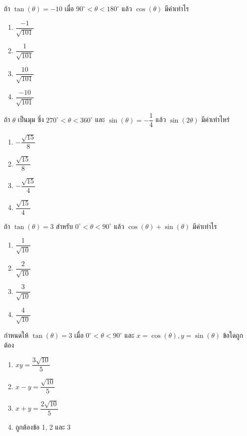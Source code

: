 \begin{examplebox}
ถ้า $\tan(\theta)=-10$ เมื่อ $90^{\circ}<\theta<180^{\circ}$ แล้ว $\cos(\theta)$ มีค่าเท่าไร
\begin{enumerate}
\item $\dfrac{-1}{\sqrt{101}}$
\item $\dfrac{1}{\sqrt{101}}$
\item $\dfrac{10}{\sqrt{101}}$
\item $\dfrac{-10}{\sqrt{101}}$
\end{enumerate}
\end{examplebox}

\begin{examplebox}
ถ้า $\theta$ เป็นมุม ซึ่ง $270^{\circ}<\theta<360^{\circ}$ และ $\sin(\theta)=-\dfrac{1}{4}$ แล้ว $\sin(2\theta)$ มีค่าเท่าไหร่
\begin{enumerate}
\item $-\dfrac{\sqrt{15}}{8}$
\item $\dfrac{\sqrt{15}}{8}$
\item $-\dfrac{\sqrt{15}}{4}$
\item $\dfrac{\sqrt{15}}{4}$
\end{enumerate}
\end{examplebox}

\begin{examplebox}
ถ้า $\tan(\theta)=3$ สำหรับ $0^{\circ}<\theta<90^{\circ}$ แล้ว $\cos(\theta)+\sin( \theta)$ มีค่าเท่าไร
\begin{enumerate}
\item $\dfrac{1}{\sqrt{10}}$
\item $\dfrac{2}{\sqrt{10}}$
\item $\dfrac{3}{\sqrt{10}}$
\item $\dfrac{4}{\sqrt{10}}$
\end{enumerate}
\end{examplebox}

\begin{examplebox}
กำหนดให้ $\tan(\theta)=3$ เมื่อ $0^{\circ}<\theta<90^{\circ}$ และ $x=\cos(\theta), y=\sin(\theta)$ ข้อใดถูกต้อง
\begin{enumerate}
\item $x y=\dfrac{3 \sqrt{10}}{5}$
\item  $x-y=\dfrac{\sqrt{10}}{5}$
\item  $x+y=\dfrac{2 \sqrt{10}}{5}$
\item  ถูกต้องข้อ 1, 2 และ 3
\end{enumerate}
\end{examplebox}


